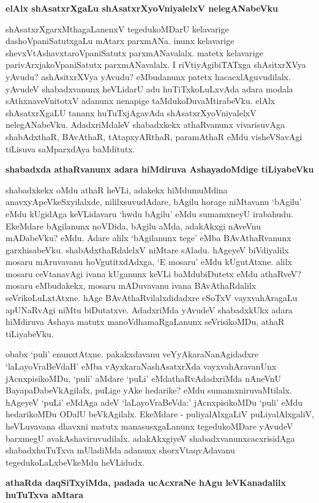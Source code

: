 {\bigskip
\noindent
{\large\bf elAlx shAsatxrXgaLu shAsatxrXyoVniyalelxV nelegANabeVku}}\label{page179}
\medskip

\noindent
shAsatxrXgarxMthagaLanenxV tegedukoMDarU kelavarige dashoVpaniSatutxgaLu mAtarx parxmANa. inunx kelavarige shevxVtAshavxtaroVpaniSatutx parxmANavalalx. matetx kelavarige parivArxja\-koVpaniSatutx parxmANavalalx. I riVtiyAgi\-biTATxga shAsitxrXVya yAvudu? ashAsitxrXVya yAvudu? eMbudanunx patetx hacacxlAguvudilalx. yAvudeV shabadxvanunx heVLidarU adu huTiTxkoLuLxvAda adara modala sAthxnaveVnitotxV adanunx nenapige taMdukoDu\-vaMtirabeVku. elAlx shAsatxrXgaLU tananx huTuTxjAgavAda shAsatxrXyoVniyalelxV nelegANabeVku. Adadx\-riMdaleV shabadxkekx athaRvanunx vivarisuvAga shabAdxthaR, BAvAthaR, tAtapxyARthaR, paramAthaR eMdu visheVSa\-vAgi tiLisuva saMparxdAya baMditutx.

{\bigskip
\noindent
{\large\bf shabadxda athaRvanunx adara hiMdiruva AshayadoMdige tiLiyabeVku}}\label{page179}
\medskip

\noindent
shabadxkekx oMdu athaR heVLi, adakekx hiMdumuMdina anavxyApeVkeSxyilalxde, nililxsuvudAdare, bAgilu\- horage niMtavanu `bAgilu' eMdu kUgidAga keVLidavaru `hwdu bAgilu' eMdu sumamxneyU ira\-bahudu. EkeMdare bAgilanunx noVDida, bAgilu aMda, adakAkxgi nAveVnu mADabeVku? eMdu. Adare alilx `bAgilanunx tege' eMba BAvAthaRvanunx garxhisabeVku. shabAdxthaRdalelxV niMtare sAladu. hAgeyeV biVdiyalilx mosaru mAruvavanu hoVgutitxdAdxga, `E mosaru' eMdu kUgutAtxne. alilx mosaru ceVtana\-vAgi ivana kUganunx keVLi baMdubiDutetx eMdu athaRveV? mosaru eMbudakekx, mosaru mADu\-vavanu ivana BAvAthaRdalilx seVrikoLuLxtAtxne. hAge BAvAthaRvilalxdidadxre eSoTxV vayxvahAragaLu apU\-NaRvAgi niMtu biDutatxve. AdadxriMda yAvudeV shabadxkUkx adara hiMdiruva Ashaya matutx manoV\-dhamaR\-gaLanunx seVrisikoMDu, athaR tiLiyabeVku.

obabx `puli' enunxtAtxne. pakakxdavanu veYyAkaraNanAgidadxre `laLayoVra\-BeVdaH' eMba vAyxkaraNashAsatxrXda vayxvahAravanUnx jAcnxpisikoMDu, `puli' aMdare `puLi' eMdathaRvAdadxriMda nAneVnU BayapaDabeVkA\-gilalx, puLige yAke hedarike? eMdu sumamxniruvaMtilalx. hAgeyeV `puLi' eMdAga adeV `laLayoVra\-BeVda:' jAcnxpisikoMDu `puli' eMdu hedarikoMDu ODalU beVkAgilalx. EkeMdare - puliyalAlxgaLiV puLiyalAlxgaliV, heVLuvavana dhavxni matutx manasusxgaLanunx tegedukoMDare yAvudeV barxmegU ava\-kAsha\-viruvudilalx. adakAkxgiyeV shabadxvanunxcacxrisidAga shabadxhuTuTxva mUladiMda adanunx shorxVtaqvAdavanu tegedukoLaLxbeVkeMdu heVLidudx.

{\bigskip
\noindent
{\large\bf athaRda daqSiTxyiMda, padada ucAcxraNe hAgu leVKanadalilx huTuTxva aMtara}}
\medskip

